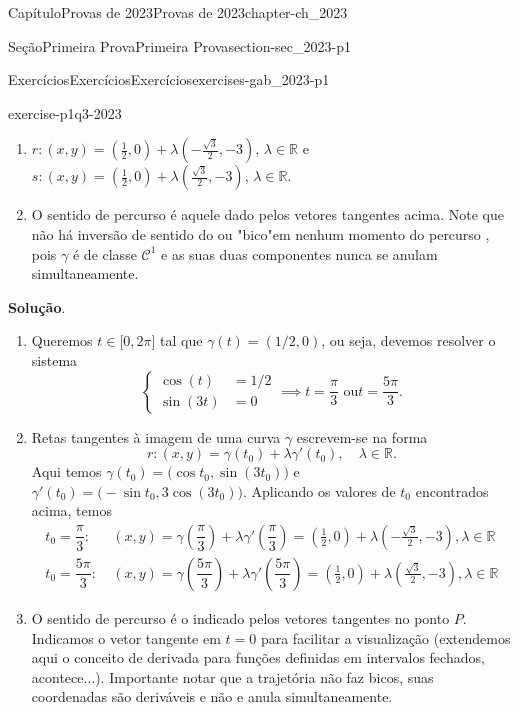 \documentclass[oneside,10pt,]{book}
\newcommand{\blocktitlefont}{\relax}
\numberwithin{equation}{section}
\newcommand{\R}{\mathbb R}
\begin{document}
\begin{chapterptx}{Capítulo}{Provas de 2023}{}{Provas de 2023}{}{}{chapter-ch_2023}
\begin{sectionptx}{Seção}{Primeira Prova}{}{Primeira Prova}{}{}{section-sec_2023-p1}
\begin{exercises-subsection-numberless}{Exercícios}{Exercícios}{}{Exercícios}{}{}{exercises-gab_2023-p1}
\begin{divisionexercise}{3}{}{}{exercise-p1q3-2023}
\begin{enumerate}[label=\alph*]
\item{}\(r\colon
(x,y)=(\frac{1}{2},0)+\lambda(-\frac{\sqrt{3}}{2},-3)\), \(\lambda\in\R\) e \(s\colon
(x,y)=(\frac{1}{2},0)+\lambda(\frac{\sqrt{3}}{2},-3)\), \(\lambda\in\R\).%
\item{}O sentido de percurso é aquele dado pelos vetores tangentes acima. Note que não há inversão de sentido do ou "bico"em nenhum momento do percurso , pois \(\gamma\) é de classe \(\mathscr{C}^1\) e as suas duas componentes nunca se anulam simultaneamente.%
\end{enumerate}
%
\par\smallskip%
\noindent\textbf{\blocktitlefont Solução}.\hypertarget{solution-p1q3-2023-c}{}\quad{}%
\begin{enumerate}[label=\alph*]
\item{}Queremos \(t\in\big[0,2\pi\big]\) tal que \(\gamma(t)=(1/2,0)\), ou seja, devemos resolver o sistema%
\begin{equation*}
\begin{cases}
\cos(t)&=1/2\\
\sin(3t)&=0
\end{cases}\implies t=\dfrac{\pi}{3}\text{ ou
}t=\dfrac{5\pi}{3}.
\end{equation*}
%
\item{}Retas tangentes à imagem de uma curva \(\gamma\) escrevem-se na forma%
\begin{equation*}
r\colon
(x,y)=\gamma(t_0)+\lambda\gamma'(t_0),\quad\lambda\in\R.
\end{equation*}
Aqui temos \(\gamma(t_0)=\big(\cos t_0,\sin(3t_0)\big)\) e \(\gamma'(t_0)=\big(-\sin
t_0,3\cos(3t_0)\big)\). Aplicando os valores de \(t_0\) encontrados acima, temos%
\begin{align*}
t_0=\dfrac{\pi}{3}:&\ 
(x,y)=\gamma(\dfrac{\pi}{3})+\lambda\gamma'(\dfrac{\pi}{3})
=(\frac{1}{2},0)+\lambda(-\frac{\sqrt{3}}{2},-3),\lambda\in\R\\
t_0=\dfrac{5\pi}{3}: &\ 
(x,y)=\gamma(\dfrac{5\pi}{3})+\lambda\gamma'(\dfrac{5\pi}{3})
=(\frac{1}{2},0)+\lambda(\frac{\sqrt{3}}{2},-3),\lambda\in\R
\end{align*}
%
\item{}O sentido de percurso é o indicado pelos vetores tangentes no ponto \(P\). Indicamos o vetor tangente em \(t=0\) para facilitar a visualização (extendemos aqui o conceito de derivada para funções definidas em intervalos fechados, acontece...). Importante notar que a trajetória não faz bicos, suas coordenadas são deriváveis e não e anula simultaneamente.%
\end{enumerate}
%
\end{divisionexercise}%
\end{exercises-subsection-numberless}
\end{sectionptx}
\end{chapterptx}
\end{document}
